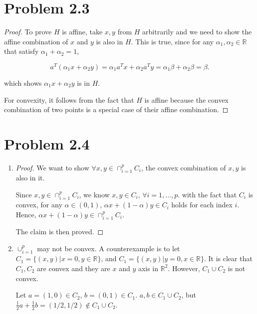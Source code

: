 \documentclass[12pt]{article}
\begin{document}
\section*{Problem 2.3}

\begin{proof}

To prove $H$ is affine, take $x, y$ from $H$ arbitrarily and we need to show the affine combination of $x$ and $y$ is also in $H$. This is true, since for any $\alpha_1, \alpha_2 \in \mathbb{R}$ that satisfy $\alpha_1 + \alpha_2  =1$, 

$$
a^T(\alpha_1 x + \alpha_2 y) = \alpha_1 a^T x + \alpha_2 a^T y = \alpha_1\beta + \alpha_2 \beta = \beta.
$$

which shows $\alpha_1 x + \alpha_2 y$ is in $H$.

For convexity, it follows from the fact that $H$ is affine because the convex combination of two points is a special case of their affine combination.

\end{proof}


\section*{Problem 2.4}

\begin{enumerate}
\item

\begin{proof}

We want to show $\forall x, y \in \cap_{i = 1}^ p C_i$, the convex combination of $x, y$ is also in it.

Since $x, y \in \cap_{i = 1}^ p C_i$, we know $x, y \in C_i$, $\forall i = 1,\dots, p$. with the fact that $C_i$ is convex, for any $\alpha \in (0, 1)$, $\alpha x + (1-\alpha) y \in C_i$ holds for each index $i$. Hence, $\alpha x + (1-\alpha) y \in \cap_{i=1} ^ p C_i$. 

The claim is then proved.

\end{proof}

\item
$\cup_{i=1}^p$ may not be convex. A counterexample is to let $C_1 = \{(x, y)| x = 0, y\in\mathbb{R}\}$, and $C_1 = \{(x, y)| y = 0, x\in\mathbb{R}\}$. It is clear that $C_1, C_2$ are convex and they are $x$ and $y$ axis in $\mathbb{R}^2$. However, $C_1\cup C_2$ is not convex. 

Let $a = (1, 0) \in C_2$, $b = (0, 1)\in C_1$. $a, b \in C_1\cup C_2$, but $\frac{1}{2} a + \frac{1}{2}b = (1/2, 1/2) \notin C_1\cup C_2$.

\end{enumerate}
\end{document}
